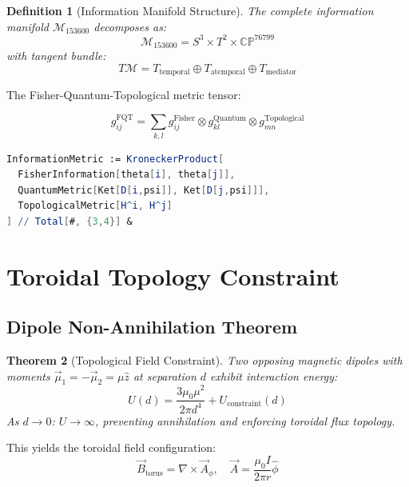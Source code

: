 \documentclass[11pt,a4paper]{article}
\newtheorem{theorem}{Theorem}
\newtheorem{definition}[theorem]{Definition}
\begin{document}
\begin{definition}[Information Manifold Structure]
The complete information manifold $\mathcal{M}_{153600}$ decomposes as:
\begin{equation}
\mathcal{M}_{153600} = S^3 \times T^2 \times \mathbb{CP}^{76799}
\end{equation}
with tangent bundle:
\begin{equation}
T\mathcal{M} = T_{\text{temporal}} \oplus T_{\text{atemporal}} \oplus T_{\text{mediator}}
\end{equation}
\end{definition}


The Fisher-Quantum-Topological metric tensor:


\begin{equation}
g_{ij}^{\text{FQT}} = \sum_{k,l} g_{ij}^{\text{Fisher}} \otimes g_{kl}^{\text{Quantum}} \otimes g_{mn}^{\text{Topological}}
\end{equation}


\begin{lstlisting}[language=Mathematica]
InformationMetric := KroneckerProduct[
  FisherInformation[theta[i], theta[j]],
  QuantumMetric[Ket[D[i,psi]], Ket[D[j,psi]]],
  TopologicalMetric[H^i, H^j]
] // Total[#, {3,4}] &
\end{lstlisting}


\section{Toroidal Topology Constraint}


\subsection{Dipole Non-Annihilation Theorem}


\begin{theorem}[Topological Field Constraint]
Two opposing magnetic dipoles with moments $\vec{\mu}_1 = -\vec{\mu}_2 = \mu\hat{z}$ at separation $d$ exhibit interaction energy:
\begin{equation}
U(d) = \frac{3\mu_0\mu^2}{2\pi d^4} + U_{\text{constraint}}(d)
\end{equation}
As $d \to 0$: $U \to \infty$, preventing annihilation and enforcing toroidal flux topology.
\end{theorem}


This yields the toroidal field configuration:
\begin{equation}
\vec{B}_{\text{torus}} = \nabla \times \vec{A}_\phi, \quad \vec{A} = \frac{\mu_0 I}{2\pi r}\hat{\phi}
\end{equation}
\end{document}
